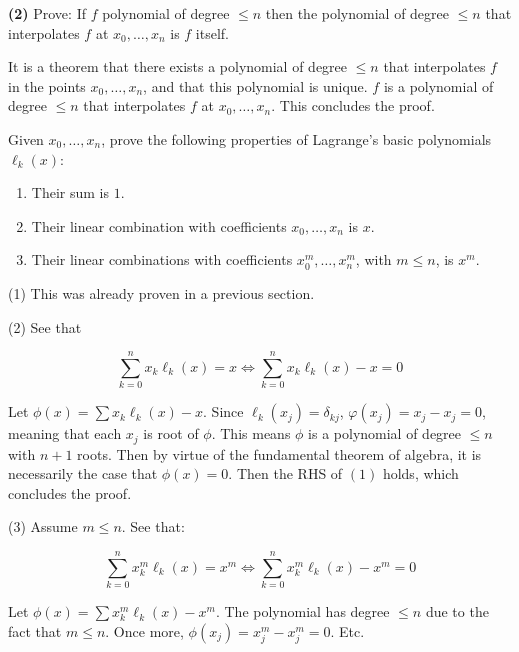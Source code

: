 \documentclass[12pt]{article}
\theoremstyle{definition}
\begin{document}
\begin{shaded}
    \textbf{(2)} Prove: If $f$ polynomial of degree $\leq n$ then the polynomial
    of degree $\leq n$ that interpolates $f$ at $x_0, \ldots, x_n$ is $f$ itself.
\end{shaded}

It is a theorem that there exists a polynomial of degree $\leq n$ that
interpolates $f$ in the points $x_0, \ldots, x_n$, and that this polynomial is
unique. $f$ is a polynomial of degree $\leq n$ that interpolates $f$ at $x_0,
\ldots, x_n$. This concludes the proof.

\pagebreak

\begin{shaded}
    Given $x_0, \ldots, x_n$, prove the following properties of Lagrange's basic
    polynomials $\ell_k(x)$:

    \begin{enumerate}
        \item Their sum is $1$.
        \item Their linear combination with coefficients $x_0,\ldots, x_n$ is
            $x$. 
        \item Their linear combinations with coefficients $x_0^m, \ldots,
            x_n^m$, with $m \leq n$, is $x^m$.
    \end{enumerate}
\end{shaded}

(1) This was already proven in a previous section.

(2) See  that

\begin{equation}
    \sum_{k=0}^n x_k \ell_k(x) = x \iff 
    \sum_{k=0}^n x_k \ell_k(x) -x  =0
\end{equation}

Let $\phi(x) = \sum x_k\ell_k(x) - x$. Since $\ell_k(x_j) = \delta_{kj}$,
$\varphi(x_j) = x_j - x_j = 0$, meaning that each $x_j$ is root of $\phi$. This
means $\phi$ is a polynomial of degree $\leq n$ with $n+1$ roots. Then by virtue
of the fundamental theorem of algebra, it is necessarily the case that $\phi(x)
= 0$. Then the RHS of $(1)$ holds, which concludes the proof.

(3) Assume $m \leq n$. See that:

\begin{equation}
    \sum_{k=0}^n x_k^m \ell_k(x) = x^m \iff \sum_{k=0}^n x_k^m \ell_k(x) - x^m =
    0
\end{equation}

Let $\phi(x) = \sum x_k^m \ell_k(x) - x^m$. The polynomial has degree $\leq n$
due to the fact that $m \leq n$. Once more, $\phi(x_j) = x^m_j - x^m_j = 0$.
Etc.
\end{document}
